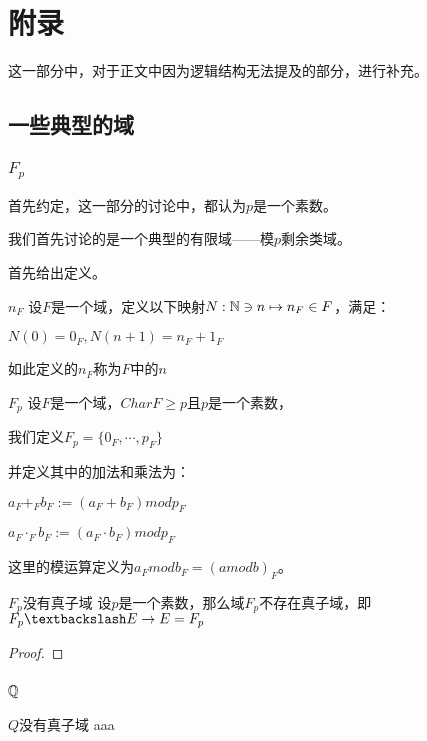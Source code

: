 \documentclass[12pt, a4paper, oneside, UTF8]{ctexbook}
\begin{document}
	\else
	\fi
	\chapter{附录}
	这一部分中，对于正文中因为逻辑结构无法提及的部分，进行补充。
		\section{一些典型的域}
			\subsection{$F_p$}
				首先约定，这一部分的讨论中，都认为$p$是一个素数。
				
				我们首先讨论的是一个典型的有限域——模$p$剩余类域。
				
				首先给出定义。
				\begin{defn}{$n_F$}{}
					设$F$是一个域，定义以下映射$N:\mathbb{N} \ni n \mapsto n_F \in F$，满足：
					
					$N(0)=0_F,N(n+1)=n_F+1_F$
					
					如此定义的$n_F$称为$F$中的$n$
				\end{defn}
				\begin{defn}{$F_p$}{}
					设$F$是一个域，$Char F \geqslant p$且$p$是一个素数，
					
					我们定义$F_p = \{0_F,\cdots,p_F\}$
					
					并定义其中的加法和乘法为：
					
					$a_F +_F b_F := (a_F + b_F) mod p_F$
					
					$a_F {\cdot}_F b_F := (a_F \cdot b_F) mod p_F$
				\end{defn}
				这里的模运算定义为$a_F mod b_F = (a mod b)_F$。
				\begin{them}{$F_p$没有真子域}{}
					设$p$是一个素数，那么域$F_p$不存在真子域，即$F_p \textbackslash E \rightarrow E = F_p$
				\end{them}
				\begin{proof}
					
				\end{proof}
			\subsection{$\mathbb{Q}$}
				\begin{them}{$Q$没有真子域}
					aaa
				\end{them}
	
	\ifx\allfiles\undefined
\end{document}
